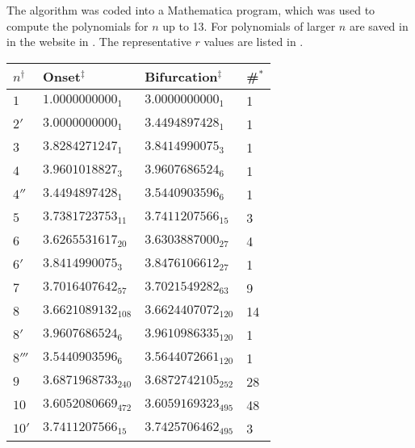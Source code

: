 \documentclass{ws-ijbc}
\begin{document}
The algorithm was coded into a Mathematica program,
which was used to compute the polynomials for $n$ up to 13.
%
For polynomials of larger $n$ are saved in in the website in .
%
The representative $r$ values are listed in .
%




\begin{table}[h]\footnotesize
{
\begin{tabular}{llll}
\hline
  $n^\dagger$
& Onset$^\ddagger$
& Bifurcation$^\ddagger$
& \#$^*$ \\
\hline
$1$     & $1.0000000000_1$      &  $3.0000000000_1$       & 1   \\
$2'$    & $3.0000000000_1$      &  $3.4494897428_1$       & 1   \\
$3$     & $3.8284271247_1$      &  $3.8414990075_3$       & 1   \\
$4$     & $3.9601018827_3$      &  $3.9607686524_6$       & 1   \\
$4''$   & $3.4494897428_1$      &  $3.5440903596_6$       & 1   \\
$5$     & $3.7381723753_{11}$   &  $3.7411207566_{15}$    & 3   \\
$6$     & $3.6265531617_{20}$   &  $3.6303887000_{27}$    & 4   \\
$6'$    & $3.8414990075_{3}$    &  $3.8476106612_{27}$    & 1   \\
$7$     & $3.7016407642_{57}$   &  $3.7021549282_{63}$    & 9   \\
$8$     & $3.6621089132_{108}$  &  $3.6624407072_{120}$   & 14  \\
$8'$    & $3.9607686524_{6}$    &  $3.9610986335_{120}$   & 1   \\
$8'''$  & $3.5440903596_{6}$    &  $3.5644072661_{120}$   & 1   \\
$9$     & $3.6871968733_{240}$  &  $3.6872742105_{252}$   & 28  \\
$10$    & $3.6052080669_{472}$  &  $3.6059169323_{495}$   & 48  \\
$10'$   & $3.7411207566_{15}$   &  $3.7425706462_{495}$   & 3   \\

\end{tabular}}
\end{table}
\end{document}
